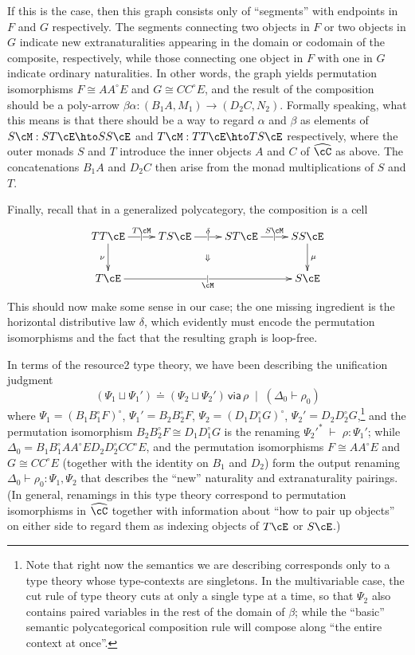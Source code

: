 \documentclass{amsart}
\newcommand{\C}{\cC}
\renewcommand{\Chat}{\ensuremath{\widehat{\C}}\xspace}
\newcommand{\E}{\cE}
\newcommand{\Tmult}{\nu}
\newcommand{\Smult}{\mu}
\renewcommand{\o}{^{\circ}}
\def\types{\;\vdash\;} %
\def\cb{\;\mid\;} %
\newcommand\combine{,}
\newcommand\combineU{\sqcup}
\def\flip#1{#1^*} %
\newcommand{\unif}[4]{#1\doteq #2\,\mathsf{ via }\,#3\cb #4}
\begin{document}
If this is the case, then this graph consists only of ``segments'' with endpoints in $F$ and $G$ respectively.
The segments connecting two objects in $F$ or two objects in $G$ indicate new extranaturalities appearing in the domain or codomain of the composite, respectively, while those connecting one object in $F$ with one in $G$ indicate ordinary naturalities.
In other words, the graph yields permutation isomorphisms $F \cong A A\o E$ and $G \cong C C\o E$, and the result of the composition should be a poly-arrow $\beta\alpha : (B_1 A, M_1) \to (D_2 C,N_2)$.
Formally speaking, what this means is that there should be a way to regard $\alpha$ and $\beta$ as elements of $S\cM : ST\E \hto SS\E$ and $T\cM : TT\E \hto TS\E$ respectively, where the outer monads $S$ and $T$ introduce the inner objects $A$ and $C$ of \Chat as above.
The concatenations $B_1 A$ and $D_2 C$ then arise from the monad multiplications of $S$ and $T$.

Finally, recall that in a generalized polycategory, the composition is a cell
\[ \xymatrix{ TT\E \ar[r]|{|}^{T \cM} \ar[d]_{\Tmult} \ar@{}[drrr]|{\Downarrow} &
  T S \E \ar[r]|{|}^{\delta} & S T \E \ar[r]|{|}^{S \cM} & S S \E \ar[d]^{\Smult}\\
  T \E \ar[rrr]|{|}_\cM &&& S \E}\]
This should now make some sense in our case; the one missing ingredient is the horizontal distributive law $\delta$, which evidently must encode the permutation isomorphisms and the fact that the resulting graph is loop-free.

In terms of the resource2 type theory, we have been describing the unification judgment
\[
\unif{(\Psi_1 \combineU \Psi_1')} {(\Psi_2 \combineU \Psi_2')} {\rho} {(\Delta_0 \vdash \rho_0)}
\]
where $\Psi_1 = (B_1 B_1\o F)\o$, $\Psi_1' = B_2 B_2\o F$, $\Psi_2 = (D_1 D_1\o G)\o$, $\Psi_2' = D_2 D_2\o G$,\footnote{Note that right now the semantics we are describing corresponds only to a type theory whose type-contexts are singletons.  In the multivariable case, the cut rule of type theory cuts at only a single type at a time, so that $\Psi_2$ also contains paired variables in the rest of the domain of $\beta$; while the ``basic'' semantic polycategorical composition rule will compose along ``the entire context at once''.} and the permutation isomorphism $B_2 B_2\o F \cong D_1 D_1\o G$ is the renaming $\flip{\Psi_2'} \types \rho : \Psi_1'$; while $\Delta_0 = B_1 B_1\o A A\o E D_2 D_2\o C C\o E$, and the permutation isomorphisms $F \cong A A\o E$ and $G \cong C C\o E$ (together with the identity on $B_1$ and $D_2$) form the output renaming $\Delta_0 \vdash \rho_0 : \Psi_1 \combine \Psi_2$ that describes the ``new'' naturality and extranaturality pairings.
(In general, renamings in this type theory correspond to permutation isomorphisms in \Chat together with information about ``how to pair up objects'' on either side to regard them as indexing objects of $T\E$ or $S\E$.)
\end{document}
